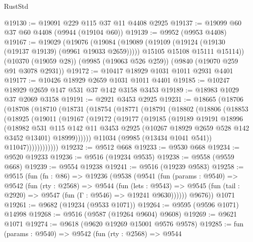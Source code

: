 \begin{lexlean}{RustStd}
\begin{coremodule}
@19130 := @19091 @229 @115 @37 @11 @4408 @2925
@19137 := @19099 @60 @37 @60 @4408 (@9944 (@19104 @60))
@19139 := @9952 (@9953 @4408)
@19167 := @19029
    (@19076
      (@19084
        (@19089 (@19109 (@19124 (@19130 (@19137 @19139) (@9961 @19033 @2659)))))
        @15105
        @15108
        @15111
        @15114))
    (@10370 (@19059 @28))
    (@9985 (@19063 @526 @259))
    (@9840 (@19070 @259 @91 @3078 @2931))
@19172 := @10417 @18929 @1031 @1011 @2931 @4401
@19177 := @10426 @18929 @2659 @1031 @1011 @4401
@19185 := @10247 @18929 @2659 @147 @531 @37 @142 @3158 @3453
@19189 := @18983 @1029 @37 @2069 @3158
@19191 := @2921 @3453 @2925
@19231 := @18665
    (@18706
      (@18708
        (@18710
          (@18731
            (@18754
              (@18771
                (@18791
                  (@18802
                    (@18806
                      (@18853
                        (@18925
                          (@19011
                            (@19167
                              (@19172
                                (@19177
                                  (@19185
                                    (@19189
                                      @19191
                                      @18996
                                      (@18982
                                        @531
                                        @115
                                        @142
                                        @11
                                        @3453
                                        @2925
                                        (@10267 @18929 @2659 @528 @142 @3452 @13401)
                                        @18999))))))
                            @11034
                            (@9985 (@13434 @1041 @541))
                            @11047))))))))))))
@19232 := @9512 @668
@19233 := @9530 @668
@19234 := @9520 @19233
@19236 := @9516 (@19234 @9535)
@19238 := @9558 (@9559 @668)
@19239 := @9554 @19238
@19241 := @9516 (@19239 @9583)
@19258 := @9515
    (fun (fn : @86) =>
    @19236
      (@9538
        (@9541
          (fun (params : @9540) =>
          @9542
            (fun (rty : @2568) =>
            @9544
              (fun (lets : @9543) =>
              @9545 (fun (tail : @2920) => @9547 (fun (Γ : @9546) => @19241 @9630))))))
        @9676))
    @1071
@19261 := @9682 (@19234 (@9533 @1071))
@19264 := @9595 (@9596 @1071) @14998
@19268 := @9516 (@9587 (@19264 @9604) @9608)
@19269 := @9621 @1071
@19274 := @9618 (@9620 @19269 @15001 @9576 @9578)
@19285 := fun (params : @9540) =>
  @9542
    (fun (rty : @2568) =>
    @9544

\end{coremodule}
\end{lexlean}
